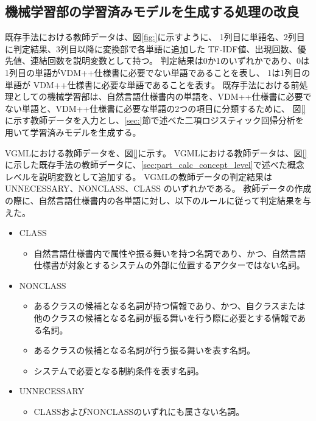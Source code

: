 \subsection{機械学習部の学習済みモデルを生成する処理の改良}
\label{sec:vgml_train_model}
既存手法における教師データは、図\ref{fig:}に示すように、
1列目に単語名、2列目に判定結果、3列目以降に変換部で各単語に追加した TF-IDF値、出現回数、優先値、連結回数を説明変数として持つ。
判定結果は0か1のいずれかであり、0は1列目の単語がVDM++仕様書に必要でない単語であることを表し、
1は1列目の単語が VDM++仕様書に必要な単語であることを表す。
既存手法における前処理としての機械学習部は、自然言語仕様書内の単語を、VDM++仕様書に必要でない単語と、VDM++仕様書に必要な単語の2つの項目に分類するために、
図\ref{}に示す教師データを入力とし、\ref{sec:}節で述べた二項ロジスティック回帰分析を用いて学習済みモデルを生成する。

VGMLにおける教師データを、図\ref{}に示す。
VGMLにおける教師データは、図\ref{}に示した既存手法の教師データに、\ref{sec:part_calc_concept_level}で述べた概念レベルを説明変数として追加する。
VGMLの教師データの判定結果はUNNECESSARY、NONCLASS、CLASS のいずれかである。
教師データの作成の際に、自然言語仕様書内の各単語に対し、以下のルールに従って判定結果を与えた。

\begin{itemize}
    \item CLASS
        \begin{itemize}
            \item 自然言語仕様書内で属性や振る舞いを持つ名詞であり、かつ、自然言語仕様書が対象とするシステムの外部に位置するアクターではない名詞。
        \end{itemize}
    \item NONCLASS
        \begin{itemize}
            \item あるクラスの候補となる名詞が持つ情報であり、かつ、自クラスまたは他のクラスの候補となる名詞が振る舞いを行う際に必要とする情報である名詞。
            \item あるクラスの候補となる名詞が行う振る舞いを表す名詞。
            \item システムで必要となる制約条件を表す名詞。
        \end{itemize}
    \item UNNECESSARY
        \begin{itemize}
            \item CLASSおよびNONCLASSのいずれにも属さない名詞。
        \end{itemize}
\end{itemize}

